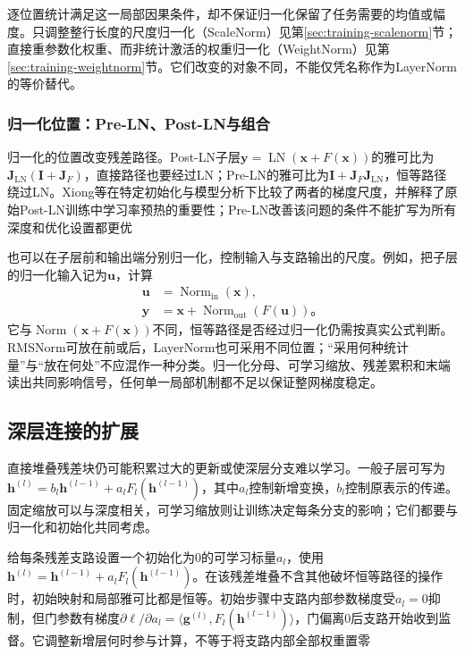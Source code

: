逐位置统计满足这一局部因果条件，却不保证归一化保留了任务需要的均值或幅度。只调整整行长度的尺度归一化（ScaleNorm）见第\ref{sec:training-scalenorm}节；直接重参数化权重、而非统计激活的权重归一化（WeightNorm）见第\ref{sec:training-weightnorm}节。它们改变的对象不同，不能仅凭名称作为LayerNorm的等价替代。

\subsubsection{归一化位置：Pre-LN、Post-LN与组合}

归一化的位置改变残差路径。Post-LN子层$\bm y=\operatorname{LN}(\bm x+F(\bm x))$的雅可比为$\bm J_{\mathrm{LN}}(\bm I+\bm J_F)$，直接路径也要经过LN；Pre-LN的雅可比为$\bm I+\bm J_F\bm J_{\mathrm{LN}}$，恒等路径绕过LN。Xiong等在特定初始化与模型分析下比较了两者的梯度尺度，并解释了原始Post-LN训练中学习率预热的重要性；Pre-LN改善该问题的条件不能扩写为所有深度和优化设置都更优

也可以在子层前和输出端分别归一化，控制输入与支路输出的尺度。例如，把子层的归一化输入记为$\bm u$，计算
\begin{equation}
  \begin{aligned}
    \bm u&=\operatorname{Norm}_{\mathrm{in}}(\bm x),\\
    \bm y&=\bm x+\operatorname{Norm}_{\mathrm{out}}(F(\bm u))\text{。}
  \end{aligned}
  \label{eq:transformer-combined-normalization}
\end{equation}
它与$\operatorname{Norm}(\bm x+F(\bm x))$不同，恒等路径是否经过归一化仍需按真实公式判断。RMSNorm可放在前或后，LayerNorm也可采用不同位置；“采用何种统计量”与“放在何处”不应混作一种分类。归一化分母、可学习缩放、残差累积和末端读出共同影响信号，任何单一局部机制都不足以保证整网梯度稳定。

\subsection{深层连接的扩展}
\label{sec:transformer-deep-connections}

直接堆叠残差块仍可能积累过大的更新或使深层分支难以学习。一般子层可写为$\bm h^{(l)}=b_l\bm h^{(l-1)}+a_lF_l(\bm h^{(l-1)})$，其中$a_l$控制新增变换，$b_l$控制原表示的传递。固定缩放可以与深度相关，可学习缩放则让训练决定每条分支的影响；它们都要与归一化和初始化共同考虑。

给每条残差支路设置一个初始化为0的可学习标量$a_l$，使用$\bm h^{(l)}=\bm h^{(l-1)}+a_lF_l(\bm h^{(l-1)})$。在该残差堆叠不含其他破坏恒等路径的操作时，初始映射和局部雅可比都是恒等。初始步骤中支路内部参数梯度受$a_l=0$抑制，但门参数有梯度$\partial\ell/\partial a_l=\langle\bm g^{(l)},F_l(\bm h^{(l-1)})\rangle$，门偏离0后支路开始收到监督。它调整新增层何时参与计算，不等于将支路内部全部权重置零

